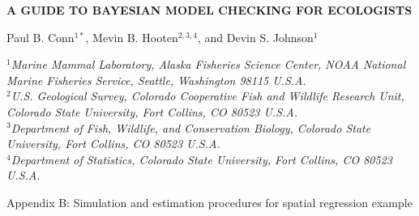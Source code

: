 \documentclass[12pt,fleqn]{article}
\begin{document}
\begin{center} \bf {\large A GUIDE TO BAYESIAN MODEL CHECKING FOR ECOLOGISTS}

\vspace{0.7cm}
Paul B. Conn$^{1*}$, Mevin B. Hooten$^{2,3,4}$, and Devin S. Johnson$^1$
\end{center}
\vspace{0.5cm}

\rm
\small

\it $^1$Marine Mammal Laboratory, Alaska Fisheries Science Center,
NOAA National Marine Fisheries Service,
Seattle, Washington 98115 U.S.A.\\

\it $^2$U.S. Geological Survey, Colorado Cooperative Fish and Wildlife Research Unit, Colorado State University, Fort Collins, CO 80523 U.S.A.\\

\it $^3$Department of Fish, Wildlife, and Conservation Biology, Colorado State University, Fort Collins, CO 80523 U.S.A.\\

\it $^4$Department of Statistics, Colorado State University, Fort Collins, CO 80523 U.S.A.\\

\raggedbottom
\vspace{.5in}

\rm
Appendix B: Simulation and estimation procedures for spatial regression example
\bigskip

\vspace{.3in}

\doublespacing
\end{document}
